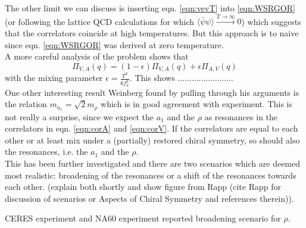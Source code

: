 The other limit we can discuss is inserting eqn. \ref{eqn:vevT} into \ref{eqn:WSRGOR} (or following the lattice QCD calculations for which $\langle \bar{\psi} \psi \rangle \overset{T \rightarrow \infty}{\longrightarrow} 0$) which suggests that the correlators coincide at high temperatures. 
But this approach is to naive since eqn. \ref{eqn:WSRGOR} was derived at zero temperature. \\
A more careful analysis of the problem shows that \cite{DeyAVmixing}
\begin{equation}
\Pi_{V,A}(q) = (1-\epsilon) \Pi_{V,A}(q) + \epsilon \Pi_{A,V}(q)
\end{equation}
with the mixing parameter $\epsilon = \frac{T^2}{6f_{\pi}^2}$. This shows ........................ \\
One other interesting result Weinberg \cite{WeinbergAVmixing} found by pulling through his arguments is the relation $m_{a_1} = \sqrt{2}m_{\rho}$ which is in good agreement with experiment. This is not really a surprise, since we expect the $a_1$ and the $\rho$ as resonances in the correlators in eqn. \ref{eqn:corA} and \ref{eqn:corV}. If the correlators are equal to each other or at least mix under a (partially) restored chiral symmetry, so should also the resonances, i.e. the $a_1$ and the $\rho$. \\
This has been further investigated and there are two scenarios which are deemed most realistic: broadening of the resonances or a shift of the resonances towards each other. (explain both shortly and show figure from Rapp (cite Rapp for discussion of scenarios or Aspects of Chiral Symmetry and references therein)).






CERES experiment \cite{CERESrho} and NA60 experiment \cite{NA60rho} reported broadening scenario for $\rho$.